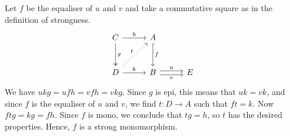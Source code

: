 Let $f$ be the equaliser of $u$ and $v$ and take a commutative square as in
the definition of strongness.
\[\begin{tikzcd}[row sep=1cm, column sep=1cm]
	C\ar[r, "h"]\ar[d, two heads, "g"] & A\ar[d, hook, "f"]\\
	D\ar[r, "k"]\ar[ur, densely dotted, "t"] & B\ar[r, shift left, "u"]\ar[r, shift right, "v" below] & E
\end{tikzcd}\]
We have $ukg = ufh = vfh = vkg$. Since $g$ is epi, this means that $uk = vk$, and
since $f$ is the equaliser of $u$ and $v$, we find $t\colon D\to A$ such that
$ft = k$. Now $ftg = kg = fh$. Since $f$ is mono, we conclude that $tg = h$,
so $t$ has the desired properties. Hence, $f$ is a strong monomorphism.
